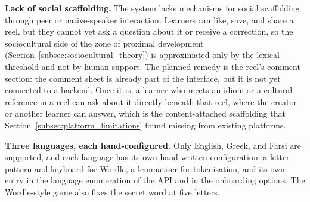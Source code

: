     \textbf{Lack of social scaffolding.} The system lacks mechanisms for social scaffolding through peer or native-speaker interaction. Learners can like, save, and share a reel, but they cannot yet ask a question about it or receive a correction, so the sociocultural side of the zone of proximal development (Section~\ref{subsec:sociocultural_theory}) is approximated only by the lexical threshold and not by human support. The planned remedy is the reel's comment section: the comment sheet is already part of the interface, but it is not yet connected to a backend. Once it is, a learner who meets an idiom or a cultural reference in a reel can ask about it directly beneath that reel, where the creator or another learner can answer, which is the content-attached scaffolding that Section~\ref{subsec:platform_limitations} found missing from existing platforms.

    \textbf{Three languages, each hand-configured.} Only English, Greek, and Farsi are supported, and each language has its own hand-written configuration: a letter pattern and keyboard for Wordle, a lemmatiser for tokenisation, and its own entry in the language enumeration of the API and in the onboarding options. The Wordle-style game also fixes the secret word at five letters.

